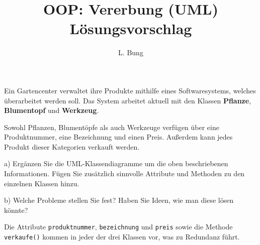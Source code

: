 \documentclass[11pt, a4paper, oneside]{article}
\begin{document}
	\author{L. Bung}
	\title{OOP: Vererbung (UML) \hspace{10cm} Lösungsvorschlag}
	\subject{SAE}
	\maketitle
	
	
	Ein Gartencenter verwaltet ihre Produkte mithilfe eines Softwaresystems, welches überarbeitet werden soll.
	Das System arbeitet aktuell mit den Klassen \textbf{Pflanze}, \textbf{Blumentopf} und \textbf{Werkzeug}.
	
	Sowohl Pflanzen, Blumentöpfe als auch Werkzeuge verfügen über eine Produktnummer, eine Bezeichnung und einen Preis.
	Außerdem kann jedes Produkt dieser Kategorien verkauft werden.
	
	a) Ergänzen Sie die UML-Klassendiagramme um die oben beschriebenen Informationen.
	Fügen Sie zusätzlich sinnvolle Attribute und Methoden zu den einzelnen Klassen hinzu.
	
	\begin{figure}[h]
		\centering
	\end{figure}
	
	b) Welche Probleme stellen Sie fest? Haben Sie Ideen, wie man diese lösen könnte?
	
	Die Attribute \texttt{produktnummer}, \texttt{bezeichnung} und \texttt{preis} sowie die Methode \texttt{verkaufe()} kommen in jeder der drei Klassen vor, was zu Redundanz führt.
	
\end{document}
